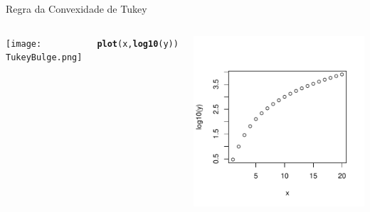 \documentclass{beamer}\usepackage[]{graphicx}\usepackage[]{color}
\makeatletter
\newcommand{\hlstd}[1]{\textcolor[rgb]{0.345,0.345,0.345}{#1}}%
\newcommand{\hlkwd}[1]{\textcolor[rgb]{0.737,0.353,0.396}{\textbf{#1}}}%
\newenvironment{kframe}{%
 \def\at@end@of@kframe{}%
 \ifinner\ifhmode%
  \def\at@end@of@kframe{\end{minipage}}%
  \begin{minipage}{\columnwidth}%
 \fi\fi%
 \def\FrameCommand##1{\hskip\@totalleftmargin \hskip-\fboxsep
 \colorbox{shadecolor}{##1}\hskip-\fboxsep
     \hskip-\linewidth \hskip-\@totalleftmargin \hskip\columnwidth}%
 \MakeFramed {\advance\hsize-\width
   \@totalleftmargin\z@ \linewidth\hsize
   \@setminipage}}%
 {\par\unskip\endMakeFramed%
 \at@end@of@kframe}
\newenvironment{knitrout}{}{} %
\renewenvironment{knitrout}{\setlength{\topsep}{0mm}}{}
\makeatother
\begin{document}
\begin{frame}{Regra da Convexidade de Tukey}

\begin{columns}[c]

\centering
\texttt{[image: TukeyBulge.png]}

\centering
\begin{knitrout}\scriptsize
{}\color{fgcolor}\begin{kframe}
\begin{alltt}
\hlkwd{plot}\hlstd{(x,}\hlkwd{log10}\hlstd{(y))}
\end{alltt}
\end{kframe}
\includegraphics[width=0.7\linewidth]{figure/rem3-1} 

\end{knitrout}

\end{columns}

\end{frame}
\end{document}
